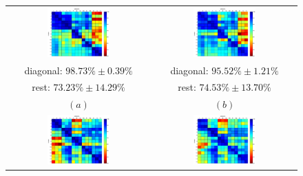 \begin{figure}[!ht] \centering
  \begin{tabular}{cc}
    \includegraphics[width=0.45\textwidth]{figs/fig_resCross1_full} & \includegraphics[width=0.45\textwidth]{figs/fig_resCross1} \\
    diagonal: $98.73\% \pm 0.39\%$  & diagonal: $95.52\% \pm 1.21\%$ \\
        rest: $73.23\% \pm 14.29\%$ & rest: $74.53\% \pm 13.70\%$ \\
    $(a)$ & $(b)$ \\
    \includegraphics[width=0.45\textwidth]{figs/fig_resCross2_full} & \includegraphics[width=0.45\textwidth]{figs/fig_resCross2} \\

\end{tabular}
\end{figure}
